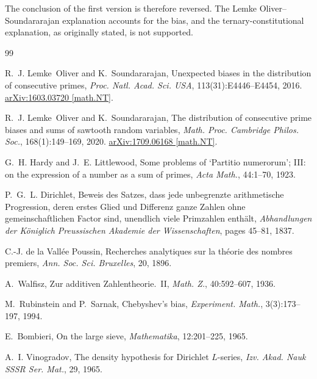 \documentclass[12pt,a4paper]{article}
\theoremstyle{plain}
\theoremstyle{definition}
\theoremstyle{remark}
\begin{document}
The conclusion of the first version is therefore reversed. The Lemke
Oliver--Soundararajan explanation accounts for the bias, and the ternary-constitutional
explanation, as originally stated, is not supported.


\begin{thebibliography}{99}

R.~J. Lemke~Oliver and K.~Soundararajan,
\newblock Unexpected biases in the distribution of consecutive primes,
\newblock \emph{Proc. Natl. Acad. Sci. USA}, 113(31):E4446--E4454, 2016.
\newblock \href{https://arxiv.org/abs/1603.03720}{arXiv:1603.03720 [math.NT]}.

R.~J. Lemke~Oliver and K.~Soundararajan,
\newblock The distribution of consecutive prime biases and sums of sawtooth
  random variables,
\newblock \emph{Math. Proc. Cambridge Philos. Soc.}, 168(1):149--169, 2020.
\newblock \href{https://arxiv.org/abs/1709.06168}{arXiv:1709.06168 [math.NT]}.

G.~H. Hardy and J.~E. Littlewood,
\newblock Some problems of `Partitio numerorum'; III: on the expression of a
  number as a sum of primes,
\newblock \emph{Acta Math.}, 44:1--70, 1923.

P.~G.~L. Dirichlet,
\newblock Beweis des Satzes, dass jede unbegrenzte arithmetische Progression,
  deren erstes Glied und Differenz ganze Zahlen ohne gemeinschaftlichen Factor
  sind, unendlich viele Primzahlen enth\"alt,
\newblock \emph{Abhandlungen der K\"oniglich Preussischen Akademie der
  Wissenschaften}, pages 45--81, 1837.

C.-J. de la Vall\'ee Poussin,
\newblock Recherches analytiques sur la th\'eorie des nombres premiers,
\newblock \emph{Ann. Soc. Sci. Bruxelles}, 20, 1896.

A.~Walfi{}sz,
\newblock Zur additiven Zahlentheorie.~II,
\newblock \emph{Math. Z.}, 40:592--607, 1936.

M.~Rubinstein and P.~Sarnak,
\newblock Chebyshev's bias,
\newblock \emph{Experiment. Math.}, 3(3):173--197, 1994.

E.~Bombieri,
\newblock On the large sieve,
\newblock \emph{Mathematika}, 12:201--225, 1965.

A.~I. Vinogradov,
\newblock The density hypothesis for Dirichlet $L$-series,
\newblock \emph{Izv. Akad. Nauk SSSR Ser. Mat.}, 29, 1965.


\end{thebibliography}
\end{document}

